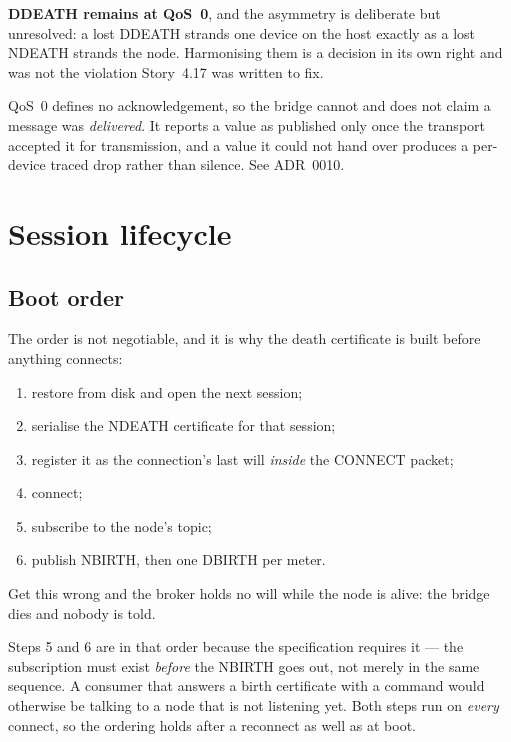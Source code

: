 \textbf{DDEATH remains at QoS~0}, and the asymmetry is deliberate but unresolved: a lost
DDEATH strands one device on the host exactly as a lost NDEATH strands the node.
Harmonising them is a decision in its own right and was not the violation Story~4.17 was
written to fix.

\begin{note}
QoS~0 defines no acknowledgement, so the bridge cannot and does not claim a message was
\emph{delivered}. It reports a value as published only once the transport accepted it for
transmission, and a value it could not hand over produces a per-device traced drop rather
than silence. See ADR~0010.
\end{note}

\section{Session lifecycle}

\subsection{Boot order}

The order is not negotiable, and it is why the death certificate is built before anything
connects:

\begin{enumerate}
  \item restore  from disk and open the next session;
  \item serialise the NDEATH certificate for that session;
  \item register it as the connection's last will \emph{inside} the CONNECT packet;
  \item connect;
  \item subscribe to the node's  topic;
  \item publish NBIRTH, then one DBIRTH per meter.
\end{enumerate}

Get this wrong and the broker holds no will while the node is alive: the bridge dies and
nobody is told.

Steps 5 and 6 are in that order because the specification requires it --- the subscription
must exist \emph{before} the NBIRTH goes out, not merely in the same sequence. A consumer
that answers a birth certificate with a command would otherwise be talking to a node that
is not listening yet. Both steps run on \emph{every} connect, so the ordering holds after a
reconnect as well as at boot.

